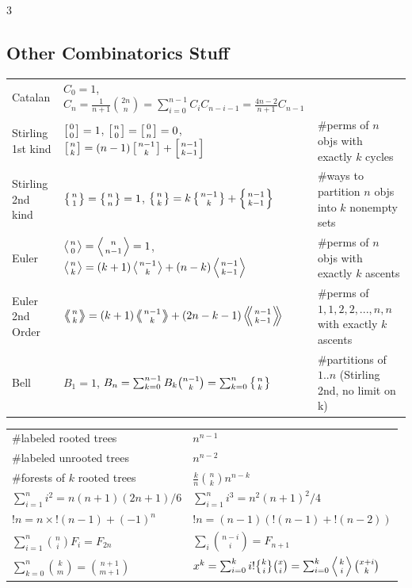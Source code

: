 \documentclass[a4paper, 8pt, landscape, oneside]{extarticle}
\DeclareRobustCommand{\stirling}{\genfrac\{\}{0pt}{}}
\begin{document}
\begin{multicols*}{3}
        \subsection{Other Combinatorics Stuff}
            \begin{tabular}{@{}l|l|l@{}}
            \toprule
            Catalan	&	$C_0=1$, $C_n=\frac{1}{n+1}\binom{2n}{n} = \sum_{i=0}^{n-1}C_iC_{n-i-1} = \frac{4n-2}{n+1}C_{n-1}$  & \\
            Stirling 1st kind & $\left[{0\atop 0}\right]=1$, $\left[{n\atop 0}\right]=\left[{0\atop n}\right]=0$, $\left[{n\atop k}\right]=(n-1)\left[{n-1\atop k}\right]+\left[{n-1\atop k-1}\right]$ & \#perms of $n$ objs with exactly $k$ cycles\\
            Stirling 2nd kind & $\left\{{n\atop 1}\right\}=\left\{{n\atop n}\right\}=1$, $\left\{{n\atop k}\right\} = k \left\{{ n-1 \atop k }\right\} + \left\{{n-1\atop k-1}\right\}$ & \#ways to partition $n$ objs into $k$ nonempty sets\\
            Euler	& $\left \langle {n\atop 0} \right \rangle = \left \langle {n\atop n-1} \right \rangle = 1 $, $\left \langle {n\atop k} \right \rangle = (k+1) \left \langle {n-1\atop {k}} \right \rangle + (n-k)\left \langle {{n-1}\atop {k-1}} \right \rangle$ & \#perms of $n$ objs with exactly $k$ ascents \\
            Euler 2nd Order &  $\left \langle \!\!\left \langle {n\atop k} \right \rangle \!\! \right \rangle = (k+1) \left \langle \!\! \left \langle {{n-1}\atop {k}} \right \rangle \!\! \right \rangle +(2n-k-1)\left \langle \!\! \left \langle {{n-1}\atop {k-1}} \right \rangle  \!\! \right \rangle$ & \#perms of ${1,1,2,2,...,n,n}$ with exactly $k$ ascents \\
            Bell & $B_1 = 1$, $B_n = \sum_{k=0}^{n-1} B_k \binom{n-1}{k} = \sum_{k=0}^n\left\{{n\atop k}\right\}$ & \#partitions of $1..n$ (Stirling 2nd, no limit on k)\\
            \bottomrule
            \end{tabular}

            \vspace{10pt}
            \begin{tabular}{ll}
                \#labeled rooted trees & $n^{n-1}$ \\
                \#labeled unrooted trees & $n^{n-2}$ \\
                \#forests of $k$ rooted trees & $\frac{k}{n}\binom{n}{k}n^{n-k}$ \\
                $\sum_{i=1}^n i^2 = n(n+1)(2n+1)/6$ & $\sum_{i=1}^n i^3 = n^2(n+1)^2/4$ \\
                $!n = n\times!(n-1)+(-1)^n$ & $!n = (n-1)(!(n-1)+!(n-2))$ \\
                $\sum_{i=1}^n \binom{n}{i} F_i = F_{2n}$ & $\sum_{i} \binom{n-i}{i} = F_{n+1}$ \\
                $\sum_{k=0}^n \binom{k}{m} = \binom{n+1}{m+1}$ & $x^k = \sum_{i=0}^k i!\stirling{k}{i}\binom{x}{i} = \sum_{i=0}^k \left\langle {k \atop i} \right\rangle\binom{x+i}{k}$ \\


\end{tabular}
\end{multicols*}
\end{document}

